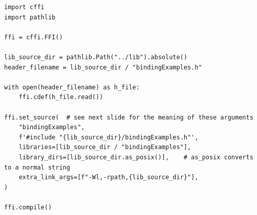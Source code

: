 \begin{frame}[fragile]
%
\begin{codebox}
\begin{verbatim}
import cffi
import pathlib

ffi = cffi.FFI()

lib_source_dir = pathlib.Path("../lib").absolute()
header_filename = lib_source_dir / "bindingExamples.h"

with open(header_filename) as h_file:
    ffi.cdef(h_file.read())

ffi.set_source(  # see next slide for the meaning of these arguments
    "bindingExamples",
    f'#include "{lib_source_dir}/bindingExamples.h"',
    libraries=[lib_source_dir / "bindingExamples"],
    library_dirs=[lib_source_dir.as_posix()],    # as_posix converts to a normal string
    extra_link_args=[f"-Wl,-rpath,{lib_source_dir}"],
)

ffi.compile()
\end{verbatim}
\end{codebox}
%
\end{frame}



